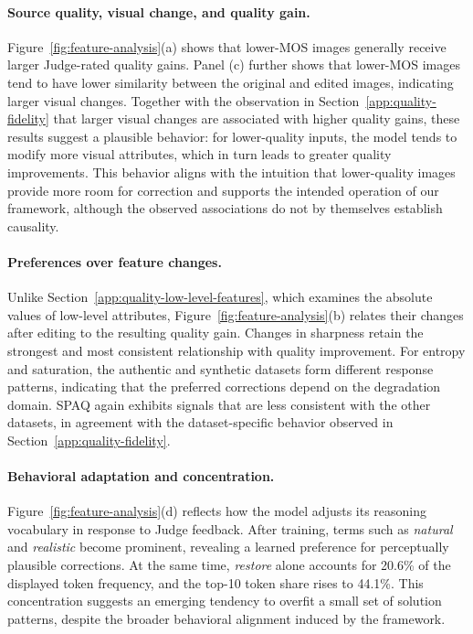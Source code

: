 \paragraph{Source quality, visual change, and quality gain.}
Figure~\ref{fig:feature-analysis}(a) shows that lower-MOS images generally
receive larger Judge-rated quality gains. Panel (c) further shows that
lower-MOS images tend to have lower similarity between the original and edited
images, indicating larger visual changes. Together with the observation in
Section~\ref{app:quality-fidelity} that larger visual changes are associated
with higher quality gains, these results suggest a plausible behavior:
for lower-quality inputs, the model tends to modify more visual attributes,
which in turn leads to greater quality improvements. This behavior aligns with
the intuition that lower-quality images provide more room for correction and
supports the intended operation of our framework, although the observed
associations do not by themselves establish causality.

\paragraph{Preferences over feature changes.}
Unlike Section~\ref{app:quality-low-level-features}, which examines the
absolute values of low-level attributes, Figure~\ref{fig:feature-analysis}(b)
relates their changes after editing to the resulting quality gain. Changes in
sharpness retain the strongest and most consistent relationship with quality
improvement. For entropy and saturation, the authentic and synthetic datasets
form different response patterns, indicating that the preferred corrections
depend on the degradation domain. SPAQ again exhibits signals that are less
consistent with the other datasets, in agreement with the dataset-specific
behavior observed in Section~\ref{app:quality-fidelity}.

\paragraph{Behavioral adaptation and concentration.}
Figure~\ref{fig:feature-analysis}(d) reflects how the model adjusts its
reasoning vocabulary in response to Judge feedback. After training, terms such
as \emph{natural} and \emph{realistic} become prominent, revealing a learned
preference for perceptually plausible corrections. At the same time,
\emph{restore} alone accounts for 20.6\% of the displayed token frequency, and
the top-10 token share rises to 44.1\%. This concentration suggests an emerging
tendency to overfit a small set of solution patterns, despite the broader
behavioral alignment induced by the framework.

